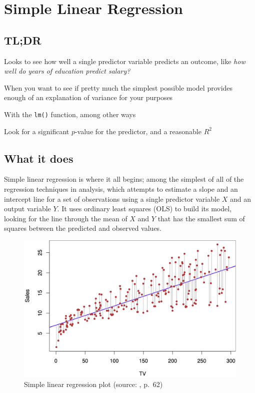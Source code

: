 \documentclass[
]{book}
\providecommand{\tightlist}{%
  \setlength{\itemsep}{0pt}\setlength{\parskip}{0pt}}
\begin{document}
\hypertarget{simple-linear-regression}{%
\chapter{Simple Linear Regression}\label{simple-linear-regression}}

\hypertarget{tldr}{%
\section{TL;DR}\label{tldr}}

\begin{description}
\tightlist
\item[What it does]
Looks to see how well a single predictor variable predicts an outcome, like \emph{how well do years of education predict salary?}
\item[When to do it]
When you want to see if pretty much the simplest possible model provides enough of an explanation of variance for your purposes
\item[How to do it]
With the \texttt{lm()} function, among other ways
\item[How to assess it]
Look for a significant \(p\)-value for the predictor, and a reasonable \(R^2\)
\end{description}

\hypertarget{what-it-does}{%
\section{What it does}\label{what-it-does}}

Simple linear regression is where it all begins; among the simplest of all of the regression techniques in analysis, which attempts to estimate a slope and an intercept line for a set of observations using a single predictor variable \(X\) and an output variable \(Y\). It uses ordinary least squares (OLS) to build its model, looking for the line through the mean of \(X\) and \(Y\) that has the smallest sum of squares between the predicted and observed values.



\begin{figure}
\includegraphics[width=16.03in]{images/3_1} \caption{Simple linear regression plot (source: \citet{ISLR}, p.~62)}\label{fig:img-slr1}
\end{figure}
\end{document}
